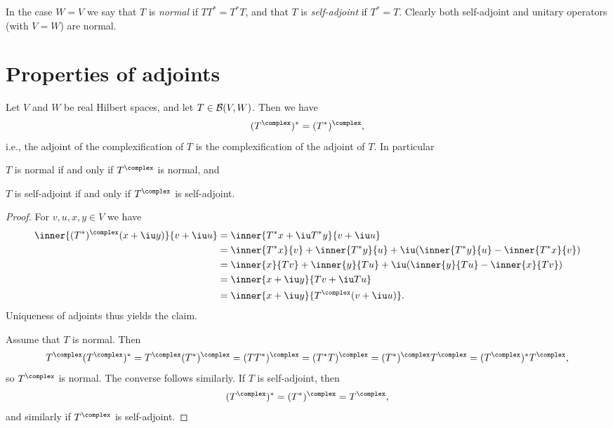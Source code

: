 \documentclass[article, a4paper, 11pt, oneside]{memoir}
\numberwithin{equation}{chapter}
\begin{document}
In the case $W = V$ we say that $T$ is \emph{normal} if $TT^* = T^*T$, and that $T$ is \emph{self-adjoint} if $T^* = T$. Clearly both self-adjoint and unitary operators (with $V = W$) are normal.


\section{Properties of adjoints}

\begin{proposition}
    \label{prop:complexification-adjoint}
    Let $V$ and $W$ be real Hilbert spaces, and let $T \in \mathcal{B}(V,W)$. Then we have
    \begin{equation*}
        (T^\complex)^*
            = (T^*)^\complex,
    \end{equation*}
    i.e., the adjoint of the complexification of $T$ is the complexification of the adjoint of $T$. In particular
    \begin{enumprop}
        \item $T$ is normal if and only if $T^\complex$ is normal, and
        \item $T$ is self-adjoint if and only if $T^\complex$ is self-adjoint.
    \end{enumprop}
\end{proposition}

\begin{proof}
    For $v,u,x,y \in V$ we have
    \begin{align*}
        \inner{(T^*)^\complex(x + \iu y)}{v + \iu u}
            &= \inner{ T^*x + \iu T^*y }{v + \iu u} \\
            &= \inner{T^*x}{v}
                + \inner{T^*y}{u}
                + \iu ( \inner{T^*y}{u} - \inner{T^*x}{v} ) \\
            &= \inner{x}{Tv}
                + \inner{y}{Tu}
                + \iu ( \inner{y}{Tu} - \inner{x}{Tv} ) \\
            &= \inner{x + \iu y}{Tv + \iu Tu} \\
            &= \inner{x + \iu y}{T^\complex(v + \iu u)}.
    \end{align*}
    Uniqueness of adjoints thus yields the claim.

    Assume that $T$ is normal. Then
    \begin{equation*}
        T^\complex (T^\complex)^*
            = T^\complex (T^*)^\complex
            = (TT^*)^\complex
            = (T^*T)^\complex
            = (T^*)^\complex T^\complex
            = (T^\complex)^* T^\complex,
    \end{equation*}
    so $T^\complex$ is normal. The converse follows similarly. If $T$ is self-adjoint, then
    \begin{equation*}
        (T^\complex)^*
            = (T^*)^\complex
            = T^\complex,
    \end{equation*}
    and similarly if $T^\complex$ is self-adjoint.
\end{proof}
\end{document}
